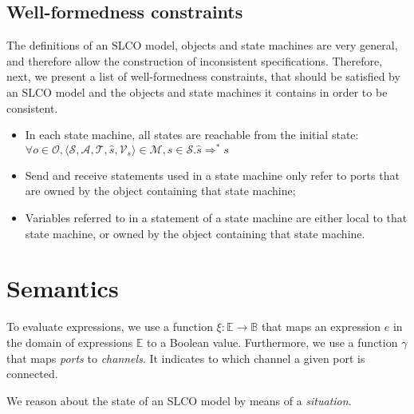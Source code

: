 \documentclass[parskip]{scrartcl}
\newcommand{\Machines}{\mathcal{M}\xspace}
\newcommand{\Variables}{\mathcal{V}\xspace}
\newcommand{\States}{\mathcal{S}\xspace}
\newcommand{\Transitions}{\mathcal{T}\xspace}
\newcommand{\Actions}{\mathcal{A}\xspace}
\newcommand{\Objects}{\mathcal{O}\xspace}
\theoremstyle{definition}
\begin{document}
\subsection{Well-formedness constraints}

The definitions of an SLCO model, objects and state machines are very general, and therefore allow the construction of inconsistent specifications. Therefore, next, we present a list of well-formedness constraints, that should be satisfied by an SLCO model and the objects and state machines it contains in order to be consistent.

\begin{itemize}
\item In each state machine, all states are reachable from the initial state:\\
$\forall o \in \Objects, \langle \States, \Actions, \Transitions, \hat s, \Variables_s \rangle \in \Machines, s \in \States. \hat s \Rightarrow^* s$

\item Send and receive statements used in a state machine only refer to ports that are owned by the object containing that state machine;

\item Variables referred to in a statement of a state machine are either local to that state machine, or owned by the object containing that state machine.

\end{itemize}

\section{Semantics}

To evaluate expressions, we use a function $\xi: \mathds{E} \to \mathds{B}$ that maps an expression $e$ in the domain of expressions $\mathds{E}$ to a Boolean value. Furthermore, we use a function $\gamma$ that maps \emph{ports} to \emph{channels}. It indicates to which channel a given port is connected.

We reason about the state of an SLCO model by means of a \emph{situation}.
\end{document}

